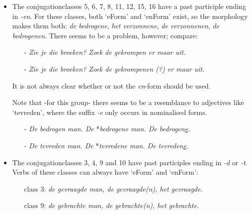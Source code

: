 \begin{itemize}
  \item The conjugationclasses 5, 6, 7, 8, 11, 12, 15, 16 have a past participle
        ending in {\em -en}. For these classes, 
        both `eForm' and `enForm' exist, so the morphology makes them both:
        {\em de bedrogene}, {\em het verzonnene}, {\em de verzonnenen}, {\em de
        bedrogenen}. There seems to be a problem, however; compare:

        \begin{itemize}
          \item [-] {\em Zie je die broeken? Zoek de gekrompen er maar uit.}
          \item [-] {\em Zie je die broeken? Zoek de gekrompenen (?) er maar 
                  uit.}
        \end{itemize}

        It is not always clear whether or not the {\em en}-form should be used.

        Note that -for this group- there seems to be a resemblance to 
        adjectives like `tevreden', where
        the suffix {\em -e} only occurs in nominalised forms.


        \begin{itemize}
          \item [-] {\em De bedrogen man. De} *{\em bedrogene man. 
                De bedrogen\underline{e}.}
          \item [-] {\em De tevreden man. De} *{\em tevredene man. 
                De tevreden\underline{e}.}
        \end{itemize}

  \item The conjugationclasses 3, 4, 9 and 10 have past participles ending in 
        {\em -d} or {\em -t}. Verbs of these classes can always have `eForm' 
        and `enForm':

        \begin{itemize}
          \item [class 3:] {\em de gevraagde man, de gevraagde(n), 
                            het gevraagde.}
          \item [class 9:] {\em de gebrachte man, de gebrachte(n), 
                            het gebrachte.}
        \end{itemize}


\end{itemize}
